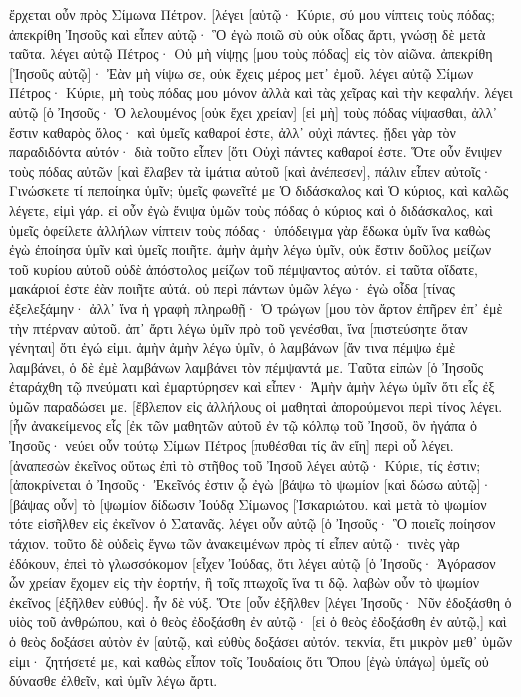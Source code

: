 ἔρχεται οὖν πρὸς Σίμωνα Πέτρον. [λέγει [αὐτῷ· Κύριε, σύ μου νίπτεις τοὺς πόδας; 
ἀπεκρίθη Ἰησοῦς καὶ εἶπεν αὐτῷ· Ὃ ἐγὼ ποιῶ σὺ οὐκ οἶδας ἄρτι, γνώσῃ δὲ μετὰ ταῦτα. 
λέγει αὐτῷ Πέτρος· Οὐ μὴ νίψῃς [μου τοὺς πόδας] εἰς τὸν αἰῶνα. ἀπεκρίθη [Ἰησοῦς αὐτῷ]· Ἐὰν μὴ νίψω σε, οὐκ ἔχεις μέρος μετ᾽ ἐμοῦ. 
λέγει αὐτῷ Σίμων Πέτρος· Κύριε, μὴ τοὺς πόδας μου μόνον ἀλλὰ καὶ τὰς χεῖρας καὶ τὴν κεφαλήν. 
λέγει αὐτῷ [ὁ Ἰησοῦς· Ὁ λελουμένος [οὐκ ἔχει χρείαν] [εἰ μὴ] τοὺς πόδας νίψασθαι, ἀλλ᾽ ἔστιν καθαρὸς ὅλος· καὶ ὑμεῖς καθαροί ἐστε, ἀλλ᾽ οὐχὶ πάντες. 
ᾔδει γὰρ τὸν παραδιδόντα αὐτόν· διὰ τοῦτο εἶπεν [ὅτι Οὐχὶ πάντες καθαροί ἐστε. 
Ὅτε οὖν ἔνιψεν τοὺς πόδας αὐτῶν [καὶ ἔλαβεν τὰ ἱμάτια αὐτοῦ [καὶ ἀνέπεσεν], πάλιν εἶπεν αὐτοῖς· Γινώσκετε τί πεποίηκα ὑμῖν; 
ὑμεῖς φωνεῖτέ με Ὁ διδάσκαλος καὶ Ὁ κύριος, καὶ καλῶς λέγετε, εἰμὶ γάρ. 
εἰ οὖν ἐγὼ ἔνιψα ὑμῶν τοὺς πόδας ὁ κύριος καὶ ὁ διδάσκαλος, καὶ ὑμεῖς ὀφείλετε ἀλλήλων νίπτειν τοὺς πόδας· 
ὑπόδειγμα γὰρ ἔδωκα ὑμῖν ἵνα καθὼς ἐγὼ ἐποίησα ὑμῖν καὶ ὑμεῖς ποιῆτε. 
ἀμὴν ἀμὴν λέγω ὑμῖν, οὐκ ἔστιν δοῦλος μείζων τοῦ κυρίου αὐτοῦ οὐδὲ ἀπόστολος μείζων τοῦ πέμψαντος αὐτόν. 
εἰ ταῦτα οἴδατε, μακάριοί ἐστε ἐὰν ποιῆτε αὐτά. 
οὐ περὶ πάντων ὑμῶν λέγω· ἐγὼ οἶδα [τίνας ἐξελεξάμην· ἀλλ᾽ ἵνα ἡ γραφὴ πληρωθῇ· Ὁ τρώγων [μου τὸν ἄρτον ἐπῆρεν ἐπ᾽ ἐμὲ τὴν πτέρναν αὐτοῦ. 
ἀπ᾽ ἄρτι λέγω ὑμῖν πρὸ τοῦ γενέσθαι, ἵνα [πιστεύσητε ὅταν γένηται] ὅτι ἐγώ εἰμι. 
ἀμὴν ἀμὴν λέγω ὑμῖν, ὁ λαμβάνων [ἄν τινα πέμψω ἐμὲ λαμβάνει, ὁ δὲ ἐμὲ λαμβάνων λαμβάνει τὸν πέμψαντά με. 
Ταῦτα εἰπὼν [ὁ Ἰησοῦς ἐταράχθη τῷ πνεύματι καὶ ἐμαρτύρησεν καὶ εἶπεν· Ἀμὴν ἀμὴν λέγω ὑμῖν ὅτι εἷς ἐξ ὑμῶν παραδώσει με. 
[ἔβλεπον εἰς ἀλλήλους οἱ μαθηταὶ ἀπορούμενοι περὶ τίνος λέγει. 
[ἦν ἀνακείμενος εἷς [ἐκ τῶν μαθητῶν αὐτοῦ ἐν τῷ κόλπῳ τοῦ Ἰησοῦ, ὃν ἠγάπα ὁ Ἰησοῦς· 
νεύει οὖν τούτῳ Σίμων Πέτρος [πυθέσθαι τίς ἂν εἴη] περὶ οὗ λέγει. 
[ἀναπεσὼν ἐκεῖνος οὕτως ἐπὶ τὸ στῆθος τοῦ Ἰησοῦ λέγει αὐτῷ· Κύριε, τίς ἐστιν; 
[ἀποκρίνεται ὁ Ἰησοῦς· Ἐκεῖνός ἐστιν ᾧ ἐγὼ [βάψω τὸ ψωμίον [καὶ δώσω αὐτῷ]· [βάψας οὖν] τὸ [ψωμίον δίδωσιν Ἰούδᾳ Σίμωνος [Ἰσκαριώτου. 
καὶ μετὰ τὸ ψωμίον τότε εἰσῆλθεν εἰς ἐκεῖνον ὁ Σατανᾶς. λέγει οὖν αὐτῷ [ὁ Ἰησοῦς· Ὃ ποιεῖς ποίησον τάχιον. 
τοῦτο δὲ οὐδεὶς ἔγνω τῶν ἀνακειμένων πρὸς τί εἶπεν αὐτῷ· 
τινὲς γὰρ ἐδόκουν, ἐπεὶ τὸ γλωσσόκομον [εἶχεν Ἰούδας, ὅτι λέγει αὐτῷ [ὁ Ἰησοῦς· Ἀγόρασον ὧν χρείαν ἔχομεν εἰς τὴν ἑορτήν, ἢ τοῖς πτωχοῖς ἵνα τι δῷ. 
λαβὼν οὖν τὸ ψωμίον ἐκεῖνος [ἐξῆλθεν εὐθύς]. ἦν δὲ νύξ. 
Ὅτε [οὖν ἐξῆλθεν [λέγει Ἰησοῦς· Νῦν ἐδοξάσθη ὁ υἱὸς τοῦ ἀνθρώπου, καὶ ὁ θεὸς ἐδοξάσθη ἐν αὐτῷ· 
[εἰ ὁ θεὸς ἐδοξάσθη ἐν αὐτῷ,] καὶ ὁ θεὸς δοξάσει αὐτὸν ἐν [αὑτῷ, καὶ εὐθὺς δοξάσει αὐτόν. 
τεκνία, ἔτι μικρὸν μεθ᾽ ὑμῶν εἰμι· ζητήσετέ με, καὶ καθὼς εἶπον τοῖς Ἰουδαίοις ὅτι Ὅπου [ἐγὼ ὑπάγω] ὑμεῖς οὐ δύνασθε ἐλθεῖν, καὶ ὑμῖν λέγω ἄρτι. 
